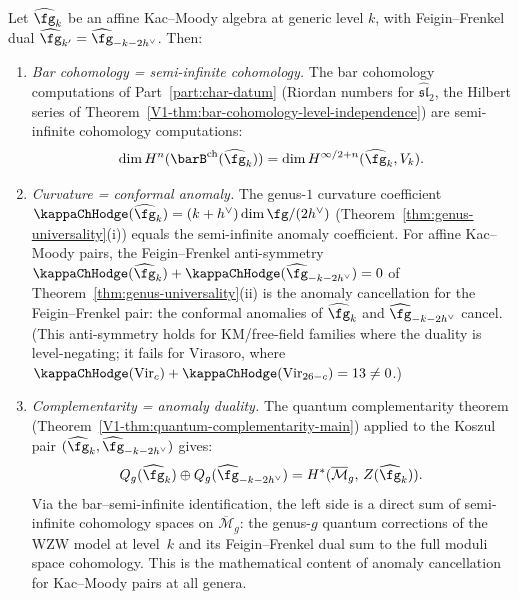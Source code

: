 \begin{corollary}
\label{cor:anomaly-duality-km}
Let $\widehat{\fg}_k$ be an affine Kac--Moody algebra at generic
level $k$, with Feigin--Frenkel dual
$\widehat{\fg}_{k'} = \widehat{\fg}_{-k-2h^\vee}$. Then:
\begin{enumerate}[label=\textup{(\alph*)}]
\item \emph{Bar cohomology = semi-infinite cohomology.}
The bar cohomology computations of
Part~\ref{part:char-datum} \textup{(}Riordan numbers for
$\widehat{\mathfrak{sl}}_2$, the Hilbert series of
Theorem~\textup{\ref{V1-thm:bar-cohomology-level-independence})}
are semi-infinite cohomology computations:
\[
\dim H^n(\barB^{\mathrm{ch}}(\widehat{\fg}_k))
= \dim H^{\infty/2+n}(\widehat{\fg}_k, V_k).
\]

\item \emph{Curvature = conformal anomaly.}
The genus-$1$ curvature coefficient
$\kappaChHodge(\widehat{\fg}_k) = (k+h^\vee)\dim\fg/(2h^\vee)$
\textup{(}Theorem~\textup{\ref{thm:genus-universality}(i))} equals
the semi-infinite anomaly coefficient. For affine Kac--Moody pairs,
the Feigin--Frenkel anti-symmetry
$\kappaChHodge(\widehat{\fg}_k) + \kappaChHodge(\widehat{\fg}_{-k-2h^\vee}) = 0$
of Theorem~\textup{\ref{thm:genus-universality}(ii)} is the
anomaly cancellation for the Feigin--Frenkel pair: the
conformal anomalies of $\widehat{\fg}_k$ and
$\widehat{\fg}_{-k-2h^\vee}$ cancel.
\textup{(}This anti-symmetry holds for KM/free-field families where the
duality is level-negating; it fails for Virasoro, where
$\kappaChHodge(\mathrm{Vir}_c) + \kappaChHodge(\mathrm{Vir}_{26-c}) = 13 \neq 0$.\textup{)}

\item \emph{Complementarity = anomaly duality.}
The quantum complementarity theorem
\textup{(}Theorem~\textup{\ref{V1-thm:quantum-complementarity-main})}
applied to the Koszul pair
$(\widehat{\fg}_k, \widehat{\fg}_{-k-2h^\vee})$ gives:
\[
Q_g(\widehat{\fg}_k) \oplus Q_g(\widehat{\fg}_{-k-2h^\vee})
= H^*(\overline{\mathcal{M}}_g,\, Z(\widehat{\fg}_k)).
\]
Via the bar--semi-infinite identification, the left side is a
direct sum of semi-infinite cohomology spaces on
$\overline{\mathcal{M}}_g$: the genus-$g$ quantum corrections
of the WZW model at level~$k$ and its Feigin--Frenkel dual sum to
the full moduli space cohomology. This is the mathematical
content of anomaly cancellation for Kac--Moody pairs at all genera.


\end{enumerate}
\end{corollary}
